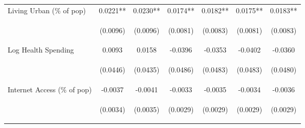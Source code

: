 \documentclass{article}
\begin{document}
\begin{table}[htbp]
{\begin{tabular}{lcccccc}
Living Urban (\% of pop) & 0.0221** & 0.0230** & 0.0174** & 0.0182** & 0.0175** & 0.0183** \\
\vspace{4pt} & \begin{footnotesize}(0.0096)\end{footnotesize} & \begin{footnotesize}(0.0096)\end{footnotesize} & \begin{footnotesize}(0.0081)\end{footnotesize} & \begin{footnotesize}(0.0083)\end{footnotesize} & \begin{footnotesize}(0.0081)\end{footnotesize} & \begin{footnotesize}(0.0083)\end{footnotesize} \\
Log Health Spending & 0.0093 & 0.0158 & -0.0396 & -0.0353 & -0.0402 & -0.0360 \\
\vspace{4pt} & \begin{footnotesize}(0.0446)\end{footnotesize} & \begin{footnotesize}(0.0435)\end{footnotesize} & \begin{footnotesize}(0.0486)\end{footnotesize} & \begin{footnotesize}(0.0483)\end{footnotesize} & \begin{footnotesize}(0.0483)\end{footnotesize} & \begin{footnotesize}(0.0480)\end{footnotesize} \\
Internet Access (\% of pop) & -0.0037 & -0.0041 & -0.0033 & -0.0035 & -0.0034 & -0.0036 \\
\vspace{4pt} & \begin{footnotesize}(0.0034)\end{footnotesize} & \begin{footnotesize}(0.0035)\end{footnotesize} & \begin{footnotesize}(0.0029)\end{footnotesize} & \begin{footnotesize}(0.0029)\end{footnotesize} & \begin{footnotesize}(0.0029)\end{footnotesize} & \begin{footnotesize}(0.0029)\end{footnotesize} \\

\end{tabular}}
\end{table}
\end{document}
